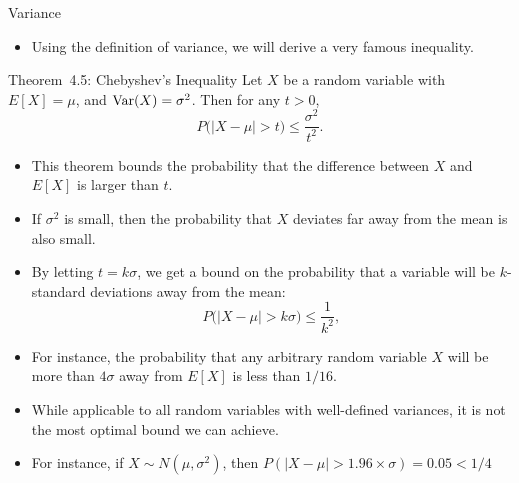 \begin{frame}[allowframebreaks]{Variance}
  \framebreak
  
  \begin{itemize}
    \item Using the definition of variance, we will derive a very famous inequality.
  \end{itemize}
  
  \begin{block}{Theorem~4.5: Chebyshev's Inequality}
    Let $X$ be a random variable with $E[X] = \mu$, and $\mathrm{Var}(X) = \sigma^2$. Then for any $t > 0$,
    $$
    P\big(|X - \mu| > t\big) \leq \frac{\sigma^2}{t^2}.
    $$
  \end{block}
  
  \framebreak
  
  \begin{itemize}
    \item This theorem bounds the probability that the difference between $X$ and $E[X]$ is larger than $t$.
    \item If $\sigma^2$ is small, then the probability that $X$ deviates far away from the mean is also small.
    \item By letting $t = k\sigma$, we get a bound on the probability that a variable will be $k$-standard deviations away from the mean:
    $$
    P\big(|X - \mu| > k\sigma\big)\leq \frac{1}{k^2},
    $$
    \item For instance, the probability that any arbitrary random variable $X$ will be more than $4\sigma$ away from $E[X]$ is less than $1/16$.
    \item While applicable to all random variables with well-defined variances, it is not the most optimal bound we can achieve.
    \item For instance, if $X \sim N(\mu, \sigma^2)$, then $P(|X - \mu| > 1.96\times \sigma) = 0.05 < 1/4$
  \end{itemize}
  

\end{frame}
